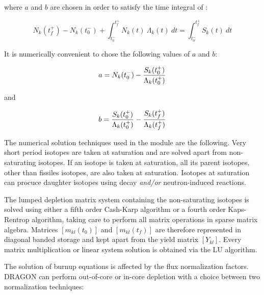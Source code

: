 \noindent where $a$ and $b$ are chosen in order to satisfy the time integral of :

\begin{equation}
N_k(t_f^+)-N_k(t_0^-) + \int_{t_0^-}^{t_f^+}{N_k(t) \ \Lambda_k(t) \ dt} =
\int_{t_0^-}^{t_f^+}{S_k(t) \ dt}
\end{equation}

It is numerically convenient to chose the following values of $a$ and $b$:

\begin{equation}
a=N_k(t_0^-)-{S_k(t_0^+) \over \Lambda_k(t_0^+)}
\end{equation}

\noindent and

\begin{equation}
b={S_k(t_0^+) \over \Lambda_k(t_0^+)}-{S_k(t_f^+) \over \Lambda_k(t_f^+)}
\end{equation}

\vskip 0.2cm

The numerical solution techniques used in the  module are the following.
Very short period isotopes are taken at saturation and are solved apart from non-saturating
isotopes. If an isotope is taken at saturation, all its parent isotopes, other than fissiles
isotopes, are also taken at saturation. Isotopes at saturation can procuce daughter isotopes
using decay {\sl and/or} neutron-induced reactions.

\vskip 0.2cm

The lumped depletion matrix system containing the non-saturating isotopes is solved
using either a fifth order Cash-Karp algorithm or a fourth order Kaps-Rentrop
algorithm\cite{recipie}, taking care to perform all matrix operations in sparse matrix algebra.
Matrices $\left[ m_{kl}(t_0) \right]$ and $\left[ m_{kl}(t_f) \right]$ are therefore
represented in diagonal banded storage and kept apart from the yield matrix
$\left[ Y_{kl}\right]$. Every matrix multiplication or linear system solution is obtained
via the LU algorithm.

\vskip 0.2cm

The solution of burnup equations is affected by the flux normalization factors. DRAGON can
perform out-of-core or in-core depletion with a choice between two normalization techniques:

